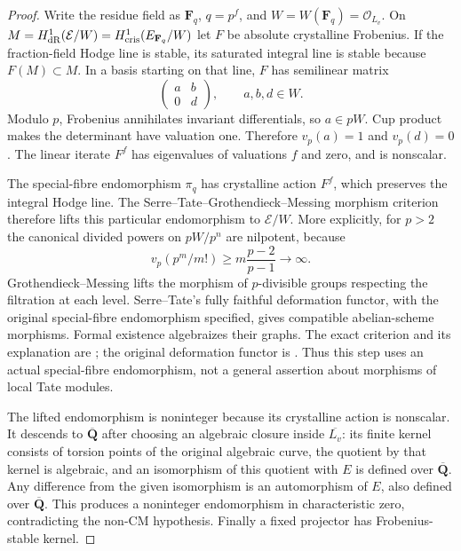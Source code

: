 \documentclass[11pt]{article}
\theoremstyle{definition}\newtheorem{definition}[theorem]{Definition}
\theoremstyle{remark}\newtheorem{remark}[theorem]{Remark}
\newcommand{\Qb}{\overline{\mathbf Q}}\newcommand{\Fp}{\mathbf F_p}
\begin{document}
\begin{proof}
Write the residue field as $\mathbf F_q$, $q=p^f$, and $W=W(\mathbf F_q)=\mathcal O_{L_v}$. On
$M=H^1_{\mathrm{dR}}(\mathcal E/W)=H^1_{\mathrm{cris}}(E_{\mathbf F_q}/W)$ let $F$ be absolute crystalline Frobenius. If the fraction-field Hodge line is stable, its saturated integral line is stable because $F(M)\subset M$. In a basis starting on that line, $F$ has semilinear matrix
\[
                        \begin{pmatrix}a&b\\0&d\end{pmatrix},\qquad a,b,d\in W.
\]
Modulo $p$, Frobenius annihilates invariant differentials, so $a\in pW$. Cup product makes the determinant have valuation one. Therefore $v_p(a)=1$ and $v_p(d)=0$. The linear iterate $F^f$ has eigenvalues of valuations $f$ and zero, and is nonscalar.

The special-fibre endomorphism $\pi_q$ has crystalline action $F^f$, which preserves the integral Hodge line. The Serre--Tate--Grothendieck--Messing morphism criterion therefore lifts this particular endomorphism to $\mathcal E/W$. More explicitly, for $p>2$ the canonical divided powers on $pW/p^n$ are nilpotent, because
\[
 v_p(p^m/m!)\ge m\frac{p-2}{p-1}\longrightarrow\infty.
\]
Grothendieck--Messing lifts the morphism of $p$-divisible groups respecting the filtration at each level. Serre--Tate's fully faithful deformation functor, with the original special-fibre endomorphism specified, gives compatible abelian-scheme morphisms. Formal existence algebraizes their graphs. The exact criterion and its explanation are \cite[Theorem 3.4, Remark 3.5, pp.~12--13; Appendix B, pp.~35--37]{LiftingTraces}; the original deformation functor is \cite[Theorem 1.2.1, pp.~143--145]{KatzSerreTate}. Thus this step uses an actual special-fibre endomorphism, not a general assertion about morphisms of local Tate modules.

The lifted endomorphism is noninteger because its crystalline action is nonscalar. It descends to $\Qb$ after choosing an algebraic closure inside $\overline{L_v}$: its finite kernel consists of torsion points of the original algebraic curve, the quotient by that kernel is algebraic, and an isomorphism of this quotient with $E$ is defined over $\Qb$. Any difference from the given isomorphism is an automorphism of $E$, also defined over $\Qb$. This produces a noninteger endomorphism in characteristic zero, contradicting the non-CM hypothesis. Finally a fixed projector has Frobenius-stable kernel.
\end{proof}
\end{document}
